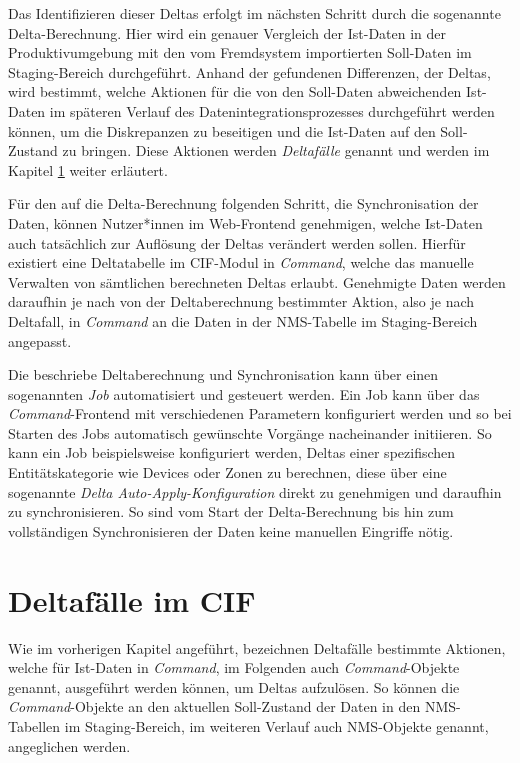 Das Identifizieren dieser Deltas erfolgt im nächsten Schritt durch die sogenannte Delta-Berechnung. Hier wird ein genauer Vergleich der Ist-Daten in der Produktivumgebung mit den vom Fremdsystem importierten Soll-Daten im Staging-Bereich durchgeführt. Anhand der gefundenen Differenzen, der Deltas, wird bestimmt, welche Aktionen für die von den Soll-Daten abweichenden Ist-Daten im späteren Verlauf des Datenintegrationsprozesses durchgeführt werden können, um die Diskrepanzen zu beseitigen und die Ist-Daten auf den Soll-Zustand zu bringen. Diese Aktionen werden \textit{Deltafälle} genannt und werden im Kapitel \ref{sec:deltacases} weiter erläutert.

Für den auf die Delta-Berechnung folgenden Schritt, die Synchronisation der Daten, können Nutzer*innen im Web-Frontend genehmigen, welche Ist-Daten auch tatsächlich zur Auflösung der Deltas verändert werden sollen. Hierfür existiert eine Deltatabelle im \ac{CIF}-Modul in \textit{Command}, welche das manuelle Verwalten von sämtlichen berechneten Deltas erlaubt. Genehmigte Daten werden daraufhin je nach von der Deltaberechnung bestimmter Aktion, also je nach Deltafall, in \textit{Command} an die Daten in der \ac{NMS}-Tabelle im Staging-Bereich angepasst.
 
Die beschriebe Deltaberechnung und Synchronisation kann über einen sogenannten \textit{Job} automatisiert und gesteuert werden. Ein Job kann über das \textit{Command}-Frontend mit verschiedenen Parametern konfiguriert werden und so bei Starten des Jobs automatisch gewünschte Vorgänge nacheinander initiieren. So kann ein Job beispielsweise konfiguriert werden, Deltas einer spezifischen Entitätskategorie wie Devices oder Zonen zu berechnen, diese über eine sogenannte \textit{Delta Auto-Apply-Konfiguration} direkt zu genehmigen und daraufhin zu synchronisieren. So sind vom Start der Delta-Berechnung bis hin zum vollständigen Synchronisieren der Daten keine manuellen Eingriffe nötig.

\section{Deltafälle im CIF}\label{sec:deltacases}
Wie im vorherigen Kapitel angeführt, bezeichnen Deltafälle bestimmte Aktionen, welche für Ist-Daten in \textit{Command}, im Folgenden auch \textit{Command}-Objekte genannt, ausgeführt werden können, um Deltas aufzulösen. So können die \textit{Command}-Objekte an den aktuellen Soll-Zustand der Daten in den \ac{NMS}-Tabellen im Staging-Bereich, im weiteren Verlauf auch \ac{NMS}-Objekte genannt, angeglichen werden.

